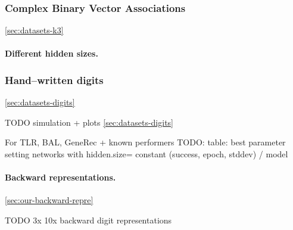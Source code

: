 \subsubsection{Complex Binary Vector Associations}
\ref{sec:datasets-k3} 


\paragraph{Different hidden sizes.} 

\subsubsection{Hand--written digits}
\ref{sec:datasets-digits} 

TODO simulation + plots \ref{sec:datasets-digits} 

For TLR, BAL, GeneRec + known performers 
TODO: table: best parameter setting networks with hidden.size= constant (success, epoch, stddev) / model \\

\paragraph{Backward representations.} 
\ref{sec:our-backward-repre} 

TODO 3x 10x backward digit representations 

